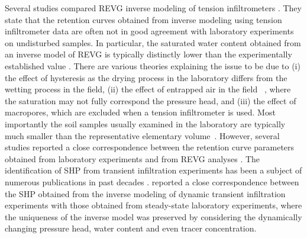 \documentclass[review]{elsarticle}
\begin{document}




Several studies  compared REVG inverse modeling of tension infiltrometers  \citep{Verbist, Simunek1, Ventrella, Schwartz, Ramos, Simunek2, rezaei}. They state that the retention curves obtained from inverse modeling using tension infiltrometer data are often not in good agreement with laboratory experiments on undisturbed samples. In particular, the saturated water content obtained from an inverse model of REVG is typically distinctly lower than the experimentally established value \citep{Simunek1, Verbist}. 
There are various theories explaining the issue to be due to (i) the effect of hysteresis as the drying process in the laboratory differs from the wetting process in the field, (ii) the effect of entrapped air in the field ~\citep{Fodor}, where the saturation may not fully correspond the pressure head, and (iii) the effect of macropores, which are excluded when a tension infiltrometer is used.  Most importantly the soil samples usually examined in the laboratory are typically much smaller than the representative elementary volume~\citep{scharnagl}.
However, several studies  reported a close correspondence between the retention curve parameters obtained from laboratory experiments and from REVG analyses \citep{Ramos, Schwartz}. 
The identification of SHP from transient infiltration experiments has been a subject of numerous publications in past decades \citep{simunek-infiltr2shp, infiltr2shp, simunek2-infiltr2shp, XU201234, BAGARELLO201770,  hess-Younes-2017}.  \cite{simunek-infiltr2shp} reported a close correspondence between the SHP obtained from the inverse modeling of dynamic transient infiltration experiments with those obtained from steady-state laboratory experiments, where the uniqueness of the inverse model was preserved by considering the dynamically changing pressure head, water content and even tracer concentration.
\end{document}
